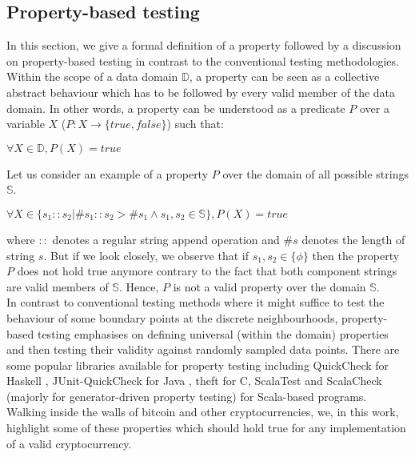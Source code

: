 
\newcommand{\avector}[2]{(#1_1,#1_2,\ldots,#1_{#2})}
\newcommand{\aDEFvector}[2][a]{(#1_1,#1_2,\ldots,#1_{#2})}

\subsection{Property-based testing}
In this section, we give a formal definition of a property followed by a discussion on property-based testing in contrast to the conventional testing methodologies.\\
Within the scope of a data domain $\mathbb{D}$, a property can be seen as a collective abstract behaviour which has to be followed by every valid member of the data domain. In other words, a property can be understood as a predicate $P$ over a variable $X$ ($P:X \rightarrow \{true, false\}$) such that: 
\begin{center}
$\forall X \in \mathbb{D}, P(X) = true$
\end{center}
Let us consider an example of a property $P$ over the domain of all possible strings $\mathbb{S}$.
\begin{center}
$\forall X \in \{s_1::s_2 | \#s_1::s_2 >  \#s_1 \wedge s_1, s_2 \in \mathbb{S}\}, P(X) = true$
\end{center}
where $::$ denotes a regular string append operation and $\#s$ denotes the length of string $s$. But if we look closely, we observe that if $s_1, s_2 \in \{\phi\}$ then the property $P$ does not hold true anymore contrary to the fact that both component strings are valid members of $\mathbb{S}$. Hence, $P$ is not a valid property over the domain $\mathbb{S}$. \\
In contrast to conventional testing methods where it might suffice to test the behaviour of some boundary points at the discrete neighbourhoods, property-based testing \cite{ron2001property} emphasises on defining universal (within the domain) properties and then testing their validity against randomly sampled data points. There are some popular libraries available for property testing including QuickCheck for Haskell \cite{claessen2011quickcheck}, JUnit-QuickCheck for Java \cite{jung2015quickcheck}, theft for C, ScalaTest \cite{venners2009scalatest} and ScalaCheck \cite{nilsson2014scalacheck} (majorly for generator-driven property testing) for Scala-based programs.
Walking inside the walls of bitcoin and other cryptocurrencies, we, in this work, highlight some of these properties which should hold true for any implementation of a valid cryptocurrency.
\nocite{earle2015functional}